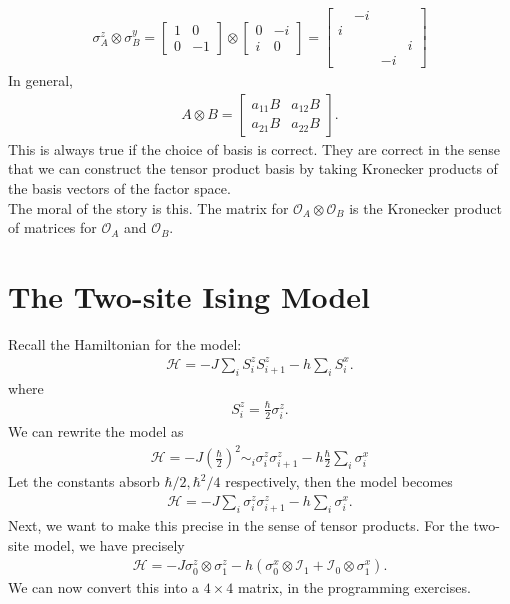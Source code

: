 \documentclass{book}
\theoremstyle{definition}
\newcommand{\had}{\mathcal{H}}
\newcommand{\f}[2]{\frac{#1}{#2}}
\newcommand{\lp}{\left(}
\newcommand{\rp}{\right)}
\newcommand{\Id}{\mathcal{I}}
\begin{document}
\begin{align}
\sigma^z_A \otimes \sigma^y_B = 
\begin{bmatrix}
1 & 0 \\ 0 & -1
\end{bmatrix} \otimes \begin{bmatrix}
0 & -i \\ i & 0
\end{bmatrix}  
=\begin{bmatrix}
&-i&& \\
i&&&\\
&&&i\\
&&-i&
\end{bmatrix}
\end{align}
In general, 
\begin{align}
A \otimes B = \begin{bmatrix}
a_{11}B & a_{12}B \\ a_{21}B & a_{22}B
\end{bmatrix}.
\end{align}
This is always true if the choice of basis is correct. They are correct in the sense that we can construct the tensor product basis by taking Kronecker products of the basis vectors of the factor space. \\


The moral of the story is this. The matrix for $\mathcal{O}_A \otimes \mathcal{O}_B$ is the Kronecker product of matrices for $\mathcal{O}_A$ and $\mathcal{O}_B$. 






\section{The Two-site Ising Model}

Recall the Hamiltonian for the model:
\begin{align}
\had = -J \sum_i S_i^z S_{i+1}^z - h \sum_i S_i^x.
\end{align}
where
\begin{align}
S_i^z = \f{\hbar}{2}\sigma_i^z.
\end{align}
We can rewrite the model as
\begin{align}
\had = -J \lp \f{\hbar}{2} \rp^2 \sim_i \sigma_i^z \sigma_{i+1}^z - h \f{\hbar}{2}\sum_i \sigma^x_i
\end{align}
Let the constants absorb $\hbar/2, \hbar^2/4$ respectively, then the model becomes
\begin{align}
\had = -J \sum_i \sigma_i^z\sigma_{i+1}^z - h\sum_i \sigma_i^x.
\end{align}
Next, we want to make this precise in the sense of tensor products. For the two-site model, we have precisely
\begin{align}
\had = -J \sigma_0^z \otimes \sigma_1^z - h (\sigma_0^x \otimes \Id_1 + \Id_0\otimes\sigma_1^x).
\end{align} 
We can now convert this into a $4\times 4$ matrix, in the programming exercises. \\
\end{document}
